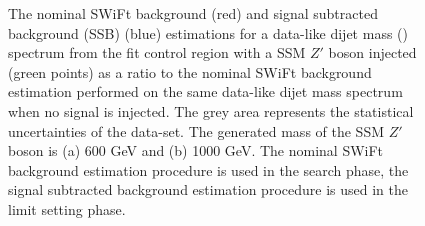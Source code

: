 \begin{figure}[!ht]
  \begin{center}
    \captionsetup[subfigure]{aboveskip=0pt,justification=centering}
     \hspace{-7mm}
     \hspace{-5mm}
  \end{center}
  \vspace{-1em}
  \caption[The nominal SWiFt background and signal subtracted background estimations
    for a data-like dijet mass  spectrum from the fit control region with a SSM $Z'$ boson injected
    as a ratio to the nominal SWiFt background estimation performed on the same data-like dijet mass spectrum when no signal is injected.]
          {The nominal SWiFt background (red) and signal subtracted background (SSB) (blue) estimations
    for a data-like dijet mass (\mjj) spectrum from the fit control region with a SSM $Z'$ boson injected (green points)
    as a ratio to the nominal SWiFt background estimation performed on the same data-like dijet mass spectrum when no signal is injected.
    The grey area represents the statistical uncertainties of the data-set.
    The generated mass of the SSM $Z'$ boson is (a) 600 GeV and (b) 1000 GeV.
    The nominal SWiFt background estimation procedure is used in the search phase,
          the signal subtracted background estimation procedure is used in the limit setting phase.}
  \label{fig:lim-lowmass_ssb_test}
\end{figure}


